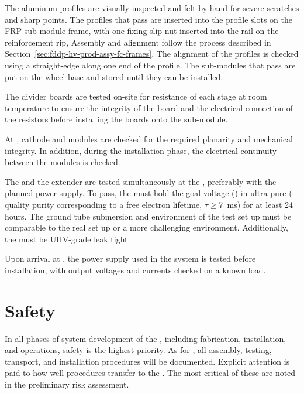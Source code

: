 The aluminum profiles are visually inspected and felt by hand for severe scratches and sharp points.  The profiles that pass are inserted into the profile slots on the FRP sub-module frame, with one fixing slip nut inserted into the rail on the reinforcement rip, 
 Assembly and alignment follow the process described in Section~\ref{sec:fddp-hv-prod-assy-fc-frames}.  The alignment of the profiles is checked using a straight-edge along one end of the profile.  The sub-modules that pass are put on the wheel base and stored until they can be installed.

The  divider boards are tested on-site for resistance of each stage at room temperature to ensure the integrity of the board and the electrical connection of the resistors before installing the boards onto the sub-module. 

At \surf, cathode and  modules are checked for the required planarity and mechanical integrity. In addition, during the installation phase, the electrical continuity between the modules is checked.

The \fdth and the  extender are tested simultaneously at the , 
preferably with the planned %
power supply. To pass, the \fdth must hold the goal voltage (\dptargetdriftvoltneg{}) in ultra pure \lar (-quality purity corresponding to a free electron lifetime, $\tau\geq$\SI{7}{\ms}) for at least \num{24} hours. The ground tube submersion and \efield environment of the test set up must be comparable to the real  set up or a more challenging environment. Additionally, the \fdth must be UHV-grade leak tight.

Upon arrival at \surf, the power supply used in the   system is tested before installation, with output voltages and currents checked on a known load. 

\noindent 
\section{Safety}
In all phases of  system development of the \dpmod, including fabrication, installation, and operations, safety is the highest priority.  As for , all assembly, testing, transport, and installation procedures will be documented. Explicit attention is paid to how well  procedures transfer to the \dpmod. The most critical of these are noted in the preliminary  risk assessment. 

